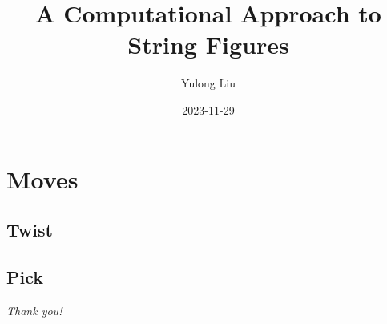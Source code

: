 \documentclass{beamer}
\title{A Computational Approach to String Figures}
\date{2023-11-29}
\author{Yulong Liu}
\begin{document}
\maketitle




\section{Moves}
\subsection{Twist}

\subsection{Pick}



\begin{frame}{}
  \centering \Large
  \emph{Thank you!}
\end{frame}
\end{document}
